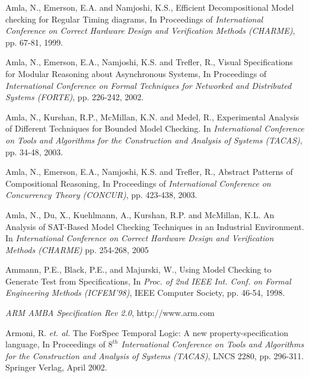 {\begin{thebibliography}{99}
 Amla, N., Emerson, E.A. and Namjoshi, K.S.,
        Efficient Decompositional Model checking for Regular Timing
        diagrams, In Proceedings of {\em International Conference on Correct
        Hardware Design and Verification Methods (CHARME)}, pp. 67-81, 1999.

 Amla, N., Emerson, E.A., Namjoshi, K.S. and Trefler, R.,
        Visual Specifications for Modular Reasoning about Asynchronous Systems,
        In Proceedings of {\em International Conference on Formal Techniques
        for Networked and Distributed Systems (FORTE)}, pp. 226-242, 2002.

 Amla, N., Kurshan, R.P., McMillan, K.N. and Medel, R., 
         Experimental Analysis of Different Techniques for Bounded Model
         Checking. In {\em International Conference on Tools and 
	 Algorithms for the
         Construction and Analysis of Systems (TACAS)}, pp. 34-48, 2003.

 Amla, N., Emerson, E.A., Namjoshi, K.S. and Trefler, R.,
        Abstract Patterns of Compositional Reasoning,
        In Proceedings of {\em International Conference on Concurrency
        Theory (CONCUR)}, pp. 423-438, 2003.

 Amla, N.,  Du, X.,  Kuehlmann, A., Kurshan, R.P. and 
	McMillan, K.L. An Analysis of SAT-Based Model Checking Techniques 
	in an Industrial Environment. In {\em International Conference on 
	Correct Hardware Design and Verification Methods (CHARME)}
        pp. 254-268, 2005

 Ammann, P.E., Black, P.E., and Majurski, W.,
        Using Model Checking to Generate Test from Specifications, In
        {\em Proc. of 2nd IEEE Int. Conf. on Formal Engineering
        Methods (ICFEM'98)}, IEEE Computer Society, pp. 46-54, 1998.

 {\em ARM AMBA Specification Rev 2.0}, http://www.arm.com

 Armoni, R. {\em et. al.} The ForSpec Temporal Logic:
        A new property-specification language,
        In Proceedings of {\em $8^{th}$ International Conference on Tools and
        Algorithms for the Construction and Analysis of Systems (TACAS)},
        LNCS 2280, pp. 296-311.  Springer Verlag, April 2002. 



\end{thebibliography}}
